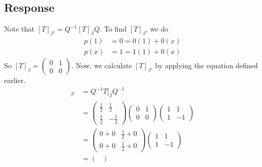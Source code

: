 \documentclass[13pt]{article}
\begin{document}
        \subsection*{Response}
        Note that $[T]_{\beta'} = Q^{-1}[T]_{\beta}Q$. To find $[T]_{\beta}$, we do
        \begin{align*}
          p(1) &= 0 = 0(1) + 0(x) \\
          p(x) &= 1 = 1(1) + 0(x)
        \end{align*}
        So $[T]_{\beta} =
        \begin{pmatrix}
          0 & 1 \\
          0 & 0
        \end{pmatrix}$. Now, we calculate $[T]_{\beta'}$ by applying the equation defined earlier.
        \begin{align*}
          [T]_{\beta'} &= Q^{-1}T]_{\beta}Q^{-1} \\
                       &=
                         \begin{pmatrix}
                           \frac{1}{2} & \frac{1}{2} \\
                           \frac{1}{2} & -\frac{1}{2}      
                         \end{pmatrix}
                         \begin{pmatrix}
                           0 & 1 \\
                           0 & 0
                         \end{pmatrix}
                         \begin{pmatrix}
                           1 & 1 \\
                           1 & -1
                         \end{pmatrix} \\
                       &=
                         \begin{pmatrix}
                           0 + 0 & \frac{1}{2} + 0 \\
                           0 + 0 & \frac{1}{2} + 0        
                         \end{pmatrix}
                         \begin{pmatrix}
                           1 & 1 \\
                           1 & -1
                         \end{pmatrix} \\
                       &=
                         \begin{pmatrix}

\end{pmatrix}
\end{align*}
\end{document}
